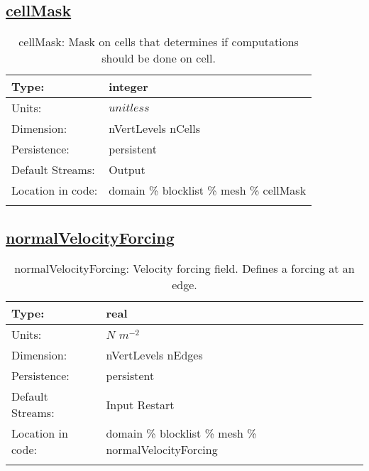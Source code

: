 \subsection[cellMask]{\hyperref[sec:var_tab_mesh]{cellMask}}
\label{subsec:var_sec_mesh_cellMask}
\begin{center}
\begin{longtable}{| p{2.0in} | p{4.0in} |}
        \hline 
        Type: & integer \\
        \hline 
        Units: & $unitless$ \\
        \hline 
        Dimension: & nVertLevels nCells \\
        \hline 
        Persistence: & persistent \\
        \hline 
		 Default Streams: & Output  \\
        \hline 
		 Location in code: & domain \% blocklist \% mesh \% cellMask \\
		 \hline 
    \caption{cellMask: Mask on cells that determines if computations should be done on cell.}
\end{longtable}
\end{center}
\subsection[normalVelocityForcing]{\hyperref[sec:var_tab_mesh]{normalVelocityForcing}}
\label{subsec:var_sec_mesh_normalVelocityForcing}
\begin{center}
\begin{longtable}{| p{2.0in} | p{4.0in} |}
        \hline 
        Type: & real \\
        \hline 
        Units: & $N$ $m^{-2}$ \\
        \hline 
        Dimension: & nVertLevels nEdges \\
        \hline 
        Persistence: & persistent \\
        \hline 
		 Default Streams: & Input Restart  \\
        \hline 
		 Location in code: & domain \% blocklist \% mesh \% normalVelocityForcing \\
		 \hline 
    \caption{normalVelocityForcing: Velocity forcing field. Defines a forcing at an edge.}
\end{longtable}
\end{center}
